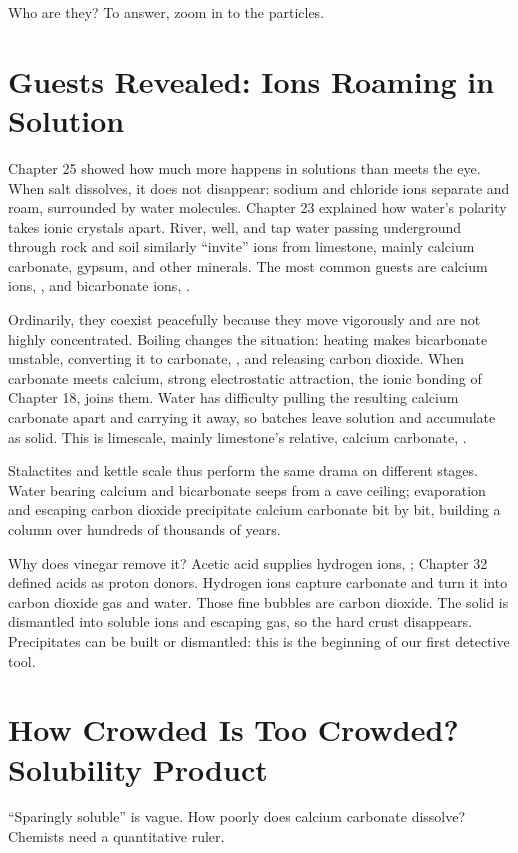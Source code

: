 Who are they? To answer, zoom in to the particles.

\section{Guests Revealed: Ions Roaming in Solution}

Chapter 25 showed how much more happens in solutions than meets the eye. When salt dissolves, it does not disappear: sodium and chloride ions separate and roam, surrounded by water molecules. Chapter 23 explained how water's polarity takes ionic crystals apart. River, well, and tap water passing underground through rock and soil similarly ``invite'' ions from limestone, mainly calcium carbonate, gypsum, and other minerals. The most common guests are calcium ions, , and bicarbonate ions, .

Ordinarily, they coexist peacefully because they move vigorously and are not highly concentrated. Boiling changes the situation: heating makes bicarbonate unstable, converting it to carbonate, , and releasing carbon dioxide. When carbonate meets calcium, strong electrostatic attraction, the ionic bonding of Chapter 18, joins them. Water has difficulty pulling the resulting calcium carbonate apart and carrying it away, so batches leave solution and accumulate as solid. This is limescale, mainly limestone's relative, calcium carbonate, .

Stalactites and kettle scale thus perform the same drama on different stages. Water bearing calcium and bicarbonate seeps from a cave ceiling; evaporation and escaping carbon dioxide precipitate calcium carbonate bit by bit, building a column over hundreds of thousands of years.

Why does vinegar remove it? Acetic acid supplies hydrogen ions, ; Chapter 32 defined acids as proton donors. Hydrogen ions capture carbonate and turn it into carbon dioxide gas and water. Those fine bubbles are carbon dioxide. The solid is dismantled into soluble ions and escaping gas, so the hard crust disappears. Precipitates can be built or dismantled: this is the beginning of our first detective tool.

\section{How Crowded Is Too Crowded? Solubility Product}

``Sparingly soluble'' is vague. How poorly does calcium carbonate dissolve? Chemists need a quantitative ruler.

